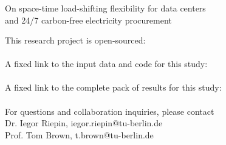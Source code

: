 



\begin{frame}\frametitle{\quad}

  {\Large
  \alert{On space-time load-shifting flexibility for data centers \\ 
  and 24/7 carbon-free electricity procurement}
  }

  {\small
  \vspace{.2cm}
  This research project is open-sourced: \\
  \faGithub~ \\
  A fixed link to the input data and code for this study: \\
  \faLink~ \\
  A fixed link to the complete pack of results for this study: \\
  \faLink~ \\

  \vspace{.2cm}
  For questions and collaboration inquiries, please contact \\
  Dr. Iegor Riepin, iegor.riepin@tu-berlin.de \\
  Prof. Tom Brown, t.brown@tu-berlin.de

  \vspace{.2cm}
  \noindent{}
  }
\end{frame}

